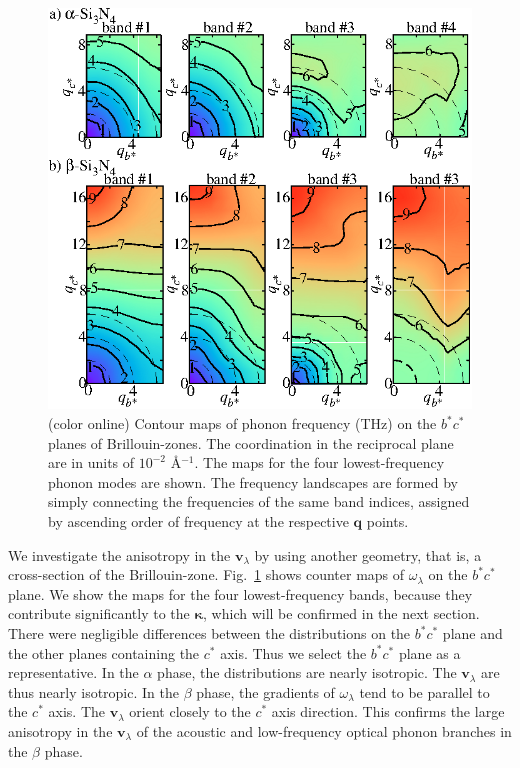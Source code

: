 \documentclass[twocolumn,amsmath,amssymb,a4paper,prb,superscriptaddress,floatfix]{revtex4-1}
\begin{document}
\begin{figure}[ht]
 \centerins
  \includegraphics[width=\linewidth]{Fig2_small.eps} \caption{(color
  online) Contour maps of phonon frequency (THz) on the $b^*c^*$
  planes of Brillouin-zones. The coordination in the reciprocal plane 
   are in units of $10^{-2}$ \AA$^{-1}$. The maps for the four lowest-frequency
  phonon modes are shown. The frequency landscapes are formed by simply
  connecting the frequencies of the same band indices, assigned by
  ascending order of frequency at the respective $\mathbf {q}$
  points. \label{fig:Fig3_338} }
 \centering
\end{figure}

We investigate the anisotropy in the $\mathbf{v}_{\lambda}$ by using another
geometry, that is, a cross-section of the Brillouin-zone.
Fig.~\ref{fig:Fig3_338} shows counter maps of $\omega_{\lambda}$  on the
$b^*c^*$ plane.  We show the maps for the four lowest-frequency bands, because
they contribute significantly to the $\boldsymbol{\kappa}$, which will be
confirmed in the next section. There were negligible differences between the
distributions on the $b^*c^*$ plane and the other planes containing the $c^*$
axis.  Thus we select the $b^*c^*$ plane as a representative.  In the $\alpha$
phase, the distributions are nearly isotropic.  The $\mathbf{v}_{\lambda}$ are
thus nearly isotropic. In the $\beta$ phase, the gradients of $\omega_\lambda$
tend to be parallel to the $c^*$ axis.  The $\mathbf{v}_{\lambda}$ orient
closely to the $c^*$ axis direction. This confirms the large anisotropy in the
$\mathbf{v}_{\lambda}$ of the acoustic and low-frequency optical phonon branches
in the $\beta$ phase.
\end{document}
